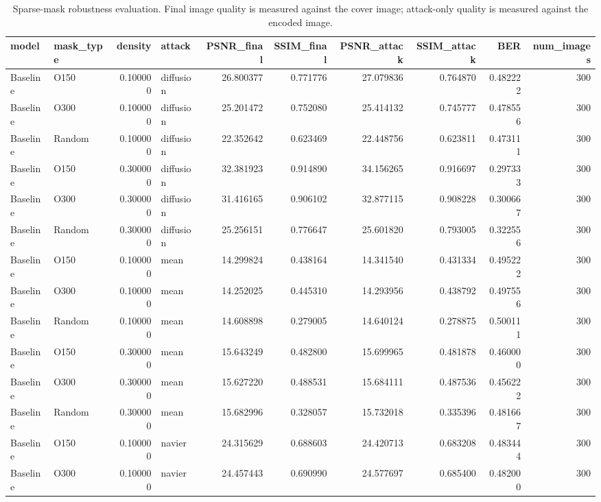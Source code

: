 
\begin{table}[h]
\centering

\caption{Sparse-mask robustness evaluation. Final image quality is measured against the cover image; attack-only quality is measured against the encoded image.}

\label{tab:sparse_mask_results}

\begin{tabular}{llrlrrrrrr}
\toprule
model & mask\_type & density & attack & PSNR\_final & SSIM\_final & PSNR\_attack & SSIM\_attack & BER & num\_images \\
\midrule
Baseline & O150 & 0.100000 & diffusion & 26.800377 & 0.771776 & 27.079836 & 0.764870 & 0.482222 & 300 \\
Baseline & O300 & 0.100000 & diffusion & 25.201472 & 0.752080 & 25.414132 & 0.745777 & 0.478556 & 300 \\
Baseline & Random & 0.100000 & diffusion & 22.352642 & 0.623469 & 22.448756 & 0.623811 & 0.473111 & 300 \\
Baseline & O150 & 0.300000 & diffusion & 32.381923 & 0.914890 & 34.156265 & 0.916697 & 0.297333 & 300 \\
Baseline & O300 & 0.300000 & diffusion & 31.416165 & 0.906102 & 32.877115 & 0.908228 & 0.300667 & 300 \\
Baseline & Random & 0.300000 & diffusion & 25.256151 & 0.776647 & 25.601820 & 0.793005 & 0.322556 & 300 \\
Baseline & O150 & 0.100000 & mean & 14.299824 & 0.438164 & 14.341540 & 0.431334 & 0.495222 & 300 \\
Baseline & O300 & 0.100000 & mean & 14.252025 & 0.445310 & 14.293956 & 0.438792 & 0.497556 & 300 \\
Baseline & Random & 0.100000 & mean & 14.608898 & 0.279005 & 14.640124 & 0.278875 & 0.500111 & 300 \\
Baseline & O150 & 0.300000 & mean & 15.643249 & 0.482800 & 15.699965 & 0.481878 & 0.460000 & 300 \\
Baseline & O300 & 0.300000 & mean & 15.627220 & 0.488531 & 15.684111 & 0.487536 & 0.456222 & 300 \\
Baseline & Random & 0.300000 & mean & 15.682996 & 0.328057 & 15.732018 & 0.335396 & 0.481667 & 300 \\
Baseline & O150 & 0.100000 & navier & 24.315629 & 0.688603 & 24.420713 & 0.683208 & 0.483444 & 300 \\
Baseline & O300 & 0.100000 & navier & 24.457443 & 0.690990 & 24.577697 & 0.685400 & 0.482000 & 300 \\

\end{tabular}
\end{table}
